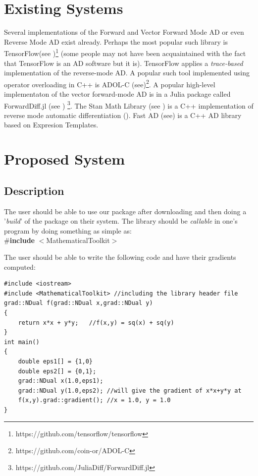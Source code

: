 \documentclass[12pt]{article}
\begin{document}
\section{Existing Systems}
Several implementations of the  Forward and Vector Forward Mode AD 
or even Reverse Mode AD exist already. Perhaps the most popular such 
library is TensorFlow(see \cite{abadi2016tensorflow})\footnote{\label{tenserflow}https://github.com/tensorflow/tensorflow} 
(some people may not have been acquaintained with the fact that
TensorFlow is an AD software but it is).
TensorFlow applies a \emph{trace-based} implementation of the reverse-mode
AD. A popular such tool implemented using operator overloading in C++ 
is ADOL-C (see\cite{adol:c})\footnote{\label{adol-c} https://github.com/coin-or/ADOL-C}.
A popular high-level implementaton of the vector forward-mode AD is in a 
Julia package called ForwardDiff.jl (see \cite{RevelsLubinPapamarkou2016})
\footnote{\label{ForwardDiff}https://github.com/JuliaDiff/ForwardDiff.jl}.
The Stan Math Library (see \cite{carpenter2015stan}) is a C++ implementation 
of reverse mode automatic differentiation (\cite{griewank}).
Fast AD (see\cite{yang2021fastad}) is a C++ AD library based on Expresion 
Templates.

\section{Proposed System}
\subsection{Description}
The user should be able to use our package after downloading and then
doing a '\emph{build}' of the package on their system. The library should 
be \emph{callable} in one's program by doing something as simple as:
\\
\#\textbf{include} $<$MathematicalToolkit$>$

The user should be able to write the following code and have their gradients
computed:
\begin{lstlisting}[caption=What Using MathematicalToolkit Would Feel Like]
#include <iostream>
#include <MathematicalToolkit> //including the library header file
grad::NDual f(grad::NDual x,grad::NDual y)
{
	return x*x + y*y;   //f(x,y) = sq(x) + sq(y)
}
int main()
{	
	double eps1[] = {1,0}
	double eps2[] = {0,1};
	grad::NDual x(1.0,eps1);
	grad::NDual y(1.0,eps2); //will give the gradient of x*x+y*y at
	f(x,y).grad::gradient(); //x = 1.0, y = 1.0							
}
\end{lstlisting}
\end{document}
